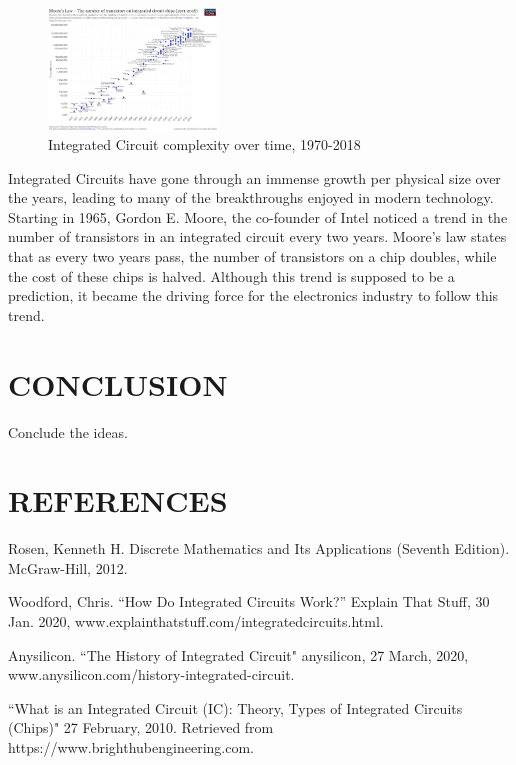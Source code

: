 \documentclass[letterpaper, 10 pt, conference]{IEEEconf}
\begin{document}
\begin{figure}[h!]
\centering
\captionsetup{justification=centering}
\includegraphics[width=0.4\textwidth]{Moore's_Law_Transistor_Count_1971-2018.png}
\caption{Integrated Circuit complexity over time, 1970-2018}
\label{fig:example}
\end{figure} 


Integrated Circuits have gone through an immense growth per physical size over the years, leading to many of the breakthroughs enjoyed in modern technology. Starting in 1965, Gordon E. Moore, the co-founder of Intel noticed a trend in the number of transistors in an integrated circuit every two years. Moore’s law states that as every two years pass, the number of transistors on a chip doubles, while the cost of these chips is halved. Although this trend is supposed to be a prediction, it became the driving force for the electronics industry to follow this trend.

\section{CONCLUSION}

Conclude the ideas.

\section*{REFERENCES}


\begin{enumerate}[label={[\arabic*]}]
\item Rosen, Kenneth  H. Discrete Mathematics and Its Applications (Seventh Edition). McGraw-Hill, 2012. 
\item Woodford, Chris. “How Do Integrated Circuits Work?” Explain That Stuff, 30 Jan. 2020, www.explainthatstuff.com/integratedcircuits.html. 
\item Anysilicon. “The History of Integrated Circuit" anysilicon, 27 March, 2020, www.anysilicon.com/history-integrated-circuit.
\item “What is an Integrated Circuit (IC): Theory, Types of Integrated Circuits (Chips)" 27 February, 2010. Retrieved from https://www.brighthubengineering.com.


\end{enumerate}
\end{document}
